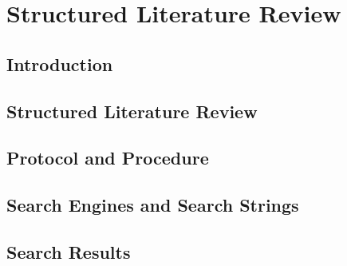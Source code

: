 \chapter{Structured Literature Review}
\label{appendix:slrreport}

\section{Introduction}


\section{Structured Literature Review}


\section{Protocol and Procedure}


\section{Search Engines and Search Strings}


\section{Search Results}


\clearpage
